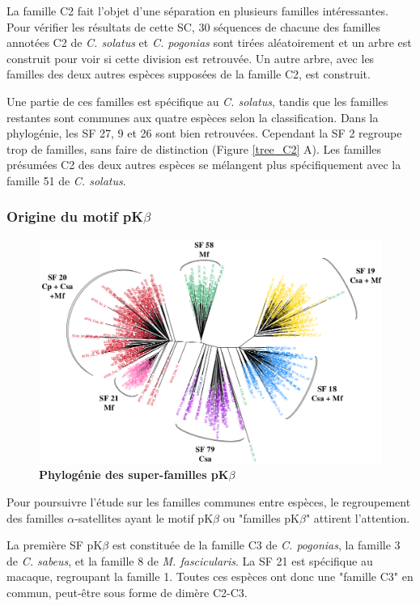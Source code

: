 \documentclass[12pt,a4paper]{article}
\begin{document}
		La famille C2 fait l'objet d'une séparation en plusieurs familles intéressantes. Pour vérifier les résultats de cette SC, 30 séquences de chacune des familles annotées C2 de \textit{C. solatus} et \textit{C. pogonias} sont tirées aléatoirement et un arbre est construit pour voir si cette division est retrouvée. Un autre arbre,  avec les familles des deux autres espèces supposées de la famille C2,  est construit.
		
		Une partie de ces familles est spécifique au \textit{C. solatus}, tandis que les familles restantes sont communes aux quatre espèces selon la classification. Dans la phylogénie, les SF 27, 9 et 26 sont bien retrouvées. Cependant la SF 2 regroupe trop de familles, sans faire de distinction (Figure \ref{tree_C2} A). Les familles présumées C2 des deux autres espèces se mélangent plus spécifiquement avec la famille 51 de \textit{C. solatus}.
						
	\subsubsection{Origine du motif pK$\beta$}
	
	\begin{figure}	
			\centering
				\includegraphics[scale=0.4]{img/pkb_tree.png}				
				\caption{\textbf{Phylogénie des super-familles pK$\beta$}
	\label{fig:pkb_tree}} 
	\end{figure}

	Pour poursuivre l'étude sur les familles communes entre espèces, le regroupement des familles $\alpha$-satellites ayant  le motif pK$\beta$ ou "familles pK$\beta$" attirent l'attention. 
	
	La première SF pK$\beta$ est constituée de la famille C3 de \textit{C. pogonias}, la famille 3 de \textit{C. sabeus}, et la famille 8 de \textit{M. fascicularis}. La SF 21 est spécifique au macaque, regroupant la famille 1. Toutes ces espèces ont donc une "famille C3" en commun, peut-être sous forme de dimère C2-C3.
	
\end{document}
